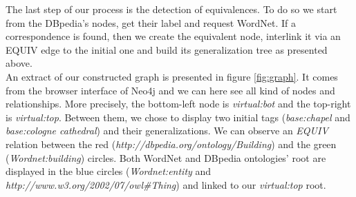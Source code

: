The last step of our process is the detection of equivalences. To do so we start from the DBpedia's nodes, get their label and request WordNet. If a correspondence is found, then we create the equivalent node, interlink it via an EQUIV edge to the initial one and build its generalization tree as presented above.\\

An extract of our constructed graph is presented in figure \ref{fig:graph}. It comes from the browser interface of Neo4j and we can here see all kind of nodes and relationships. More precisely, the bottom-left node is \emph{virtual:bot} and the top-right is \emph{virtual:top}. Between them, we chose to display two initial tags (\emph{base:chapel} and \emph{base:cologne cathedral}) and their generalizations. We can observe an \emph{EQUIV} relation between the red (\emph{http://dbpedia.org/ontology/Building}) and the green (\emph{Wordnet:building}) circles. Both WordNet and DBpedia ontologies' root are displayed in the blue circles (\emph{Wordnet:entity} and \emph{http://www.w3.org/2002/07/owl\#Thing}) and linked to our \emph{virtual:top} root.

